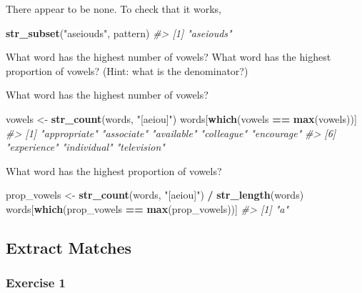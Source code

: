 \documentclass[]{book}
\newenvironment{Shaded}{\begin{snugshade}}{\end{snugshade}}
\newcommand{\CommentTok}[1]{\textcolor[rgb]{0.56,0.35,0.01}{\textit{#1}}}
\newcommand{\KeywordTok}[1]{\textcolor[rgb]{0.13,0.29,0.53}{\textbf{#1}}}
\newcommand{\NormalTok}[1]{#1}
\newcommand{\OperatorTok}[1]{\textcolor[rgb]{0.81,0.36,0.00}{\textbf{#1}}}
\newcommand{\StringTok}[1]{\textcolor[rgb]{0.31,0.60,0.02}{#1}}
\theoremstyle{plain}
\theoremstyle{remark}
\theoremstyle{definition}
\theoremstyle{definition}
\theoremstyle{definition}
\theoremstyle{remark}
\begin{document}
There appear to be none. To check that it works,

\begin{Shaded}
\begin{Highlighting}[]
\KeywordTok{str_subset}\NormalTok{(}\StringTok{"aseiouds"}\NormalTok{, pattern)}
\CommentTok{#> [1] "aseiouds"}
\end{Highlighting}
\end{Shaded}

What word has the highest number of vowels? What word has the highest
proportion of vowels? (Hint: what is the denominator?)

What word has the highest number of vowels?

\begin{Shaded}
\begin{Highlighting}[]
\NormalTok{vowels <-}\StringTok{ }\KeywordTok{str_count}\NormalTok{(words, }\StringTok{"[aeiou]"}\NormalTok{)}
\NormalTok{words[}\KeywordTok{which}\NormalTok{(vowels }\OperatorTok{==}\StringTok{ }\KeywordTok{max}\NormalTok{(vowels))]}
\CommentTok{#> [1] "appropriate" "associate"   "available"   "colleague"   "encourage"  }
\CommentTok{#> [6] "experience"  "individual"  "television"}
\end{Highlighting}
\end{Shaded}

What word has the highest proportion of vowels?

\begin{Shaded}
\begin{Highlighting}[]
\NormalTok{prop_vowels <-}\StringTok{ }\KeywordTok{str_count}\NormalTok{(words, }\StringTok{"[aeiou]"}\NormalTok{) }\OperatorTok{/}\StringTok{ }\KeywordTok{str_length}\NormalTok{(words)}
\NormalTok{words[}\KeywordTok{which}\NormalTok{(prop_vowels }\OperatorTok{==}\StringTok{ }\KeywordTok{max}\NormalTok{(prop_vowels))]}
\CommentTok{#> [1] "a"}
\end{Highlighting}
\end{Shaded}

\hypertarget{extract-matches}{%
\subsection{Extract Matches}\label{extract-matches}}

\hypertarget{exercise-1-37}{%
\subsubsection{Exercise 1}\label{exercise-1-37}}
\end{document}
